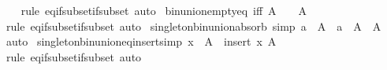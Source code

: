 \begin{isabellebody}
%
\isadelimproof
\ \ %
\endisadelimproof
%
\isatagproof
{}\isamarkupfalse%
\ {\isacharparenleft}{\kern0pt}rule\ eq{\isacharunderscore}{\kern0pt}if{\isacharunderscore}{\kern0pt}subset{\isacharunderscore}{\kern0pt}if{\isacharunderscore}{\kern0pt}subset{\isacharparenright}{\kern0pt}\ auto%
\endisatagproof
{\isafoldproof}%
%
\isadelimproof
\isanewline
%
\endisadelimproof
\isanewline
{}\isamarkupfalse%
\ bin{\isacharunderscore}{\kern0pt}union{\isacharunderscore}{\kern0pt}empty{\isacharunderscore}{\kern0pt}eq\ {\isacharbrackleft}{\kern0pt}iff{\isacharbrackright}{\kern0pt}{\isacharcolon}{\kern0pt}\ {\isachardoublequoteopen}A\ {\isasymunion}\ {\isacharbraceleft}{\kern0pt}{\isacharbraceright}{\kern0pt}\ {\isacharequal}{\kern0pt}\ A{\isachardoublequoteclose}\isanewline
%
\isadelimproof
\ \ %
\endisadelimproof
%
\isatagproof
{}\isamarkupfalse%
\ {\isacharparenleft}{\kern0pt}rule\ eq{\isacharunderscore}{\kern0pt}if{\isacharunderscore}{\kern0pt}subset{\isacharunderscore}{\kern0pt}if{\isacharunderscore}{\kern0pt}subset{\isacharparenright}{\kern0pt}\ auto%
\endisatagproof
{\isafoldproof}%
%
\isadelimproof
\isanewline
%
\endisadelimproof
\isanewline
{}\isamarkupfalse%
\ singleton{\isacharunderscore}{\kern0pt}bin{\isacharunderscore}{\kern0pt}union{\isacharunderscore}{\kern0pt}absorb\ {\isacharbrackleft}{\kern0pt}simp{\isacharbrackright}{\kern0pt}{\isacharcolon}{\kern0pt}\ {\isachardoublequoteopen}a\ {\isasymin}\ A\ {\isasymLongrightarrow}\ {\isacharbraceleft}{\kern0pt}a{\isacharbraceright}{\kern0pt}\ {\isasymunion}\ A\ {\isacharequal}{\kern0pt}\ A{\isachardoublequoteclose}\isanewline
%
\isadelimproof
\ \ %
\endisadelimproof
%
\isatagproof
{}\isamarkupfalse%
\ auto%
\endisatagproof
{\isafoldproof}%
%
\isadelimproof
\isanewline
%
\endisadelimproof
\isanewline
{}\isamarkupfalse%
\ singleton{\isacharunderscore}{\kern0pt}bin{\isacharunderscore}{\kern0pt}union{\isacharunderscore}{\kern0pt}eq{\isacharunderscore}{\kern0pt}insert{\isacharbrackleft}{\kern0pt}simp{\isacharbrackright}{\kern0pt}{\isacharcolon}{\kern0pt}\ {\isachardoublequoteopen}{\isacharbraceleft}{\kern0pt}x{\isacharbraceright}{\kern0pt}\ {\isasymunion}\ A\ {\isacharequal}{\kern0pt}\ insert\ x\ A{\isachardoublequoteclose}\isanewline
%
\isadelimproof
\ \ %
\endisadelimproof
%
\isatagproof
{}\isamarkupfalse%
\ {\isacharparenleft}{\kern0pt}rule\ eq{\isacharunderscore}{\kern0pt}if{\isacharunderscore}{\kern0pt}subset{\isacharunderscore}{\kern0pt}if{\isacharunderscore}{\kern0pt}subset{\isacharparenright}{\kern0pt}\ auto%
\endisatagproof

\end{isabellebody}
